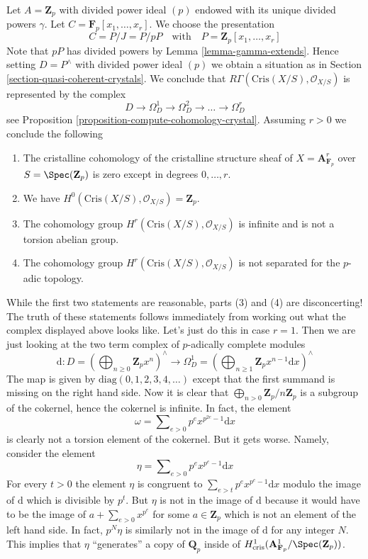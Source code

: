 \begin{example}
\label{example-affine-n-space}
Let $A = \mathbf{Z}_p$ with divided power ideal $(p)$ endowed with
its unique divided powers $\gamma$. Let
$C = \mathbf{F}_p[x_1, \ldots, x_r]$. We choose the presentation
$$
C = P/J = P/pP\quad\text{with}\quad P = \mathbf{Z}_p[x_1, \ldots, x_r]
$$
Note that $pP$ has divided powers by Lemma \ref{lemma-gamma-extends}.
Hence setting $D = P^\wedge$ with divided power ideal $(p)$ we obtain a
situation as in Section \ref{section-quasi-coherent-crystals}.
We conclude that $R\Gamma(\text{Cris}(X/S), \mathcal{O}_{X/S})$
is represented by the complex
$$
D \to \Omega^1_D \to \Omega^2_D \to \ldots \to \Omega^r_D
$$
see Proposition \ref{proposition-compute-cohomology-crystal}.
Assuming $r > 0$ we conclude the following
\begin{enumerate}
\item The cristalline cohomology of the cristalline structure sheaf
of $X = \mathbf{A}^r_{\mathbf{F}_p}$ over $S = \Spec(\mathbf{Z}_p)$
is zero except in degrees $0, \ldots, r$.
\item We have $H^0(\text{Cris}(X/S), \mathcal{O}_{X/S}) = \mathbf{Z}_p$.
\item The cohomology group $H^r(\text{Cris}(X/S), \mathcal{O}_{X/S})$
is infinite and is not a torsion abelian group.
\item The cohomology group $H^r(\text{Cris}(X/S), \mathcal{O}_{X/S})$
is not separated for the $p$-adic topology.
\end{enumerate}
While the first two statements are reasonable, parts (3) and (4) are
disconcerting! The truth of these statements follows immediately from
working out what the complex displayed above looks like. Let's just do
this in case $r = 1$. Then we are just looking at the two term complex
of $p$-adically complete modules
$$
\text{d} :
D = \left(
\bigoplus\nolimits_{n \geq 0} \mathbf{Z}_p x^n
\right)^\wedge
\longrightarrow
\Omega^1_D = \left(
\bigoplus\nolimits_{n \geq 1} \mathbf{Z}_p x^{n - 1}\text{d}x
\right)^\wedge
$$
The map is given by $\text{diag}(0, 1, 2, 3, 4, \ldots)$ except that
the first summand is missing on the right hand side. Now it is clear
that $\bigoplus_{n > 0} \mathbf{Z}_p/n\mathbf{Z}_p$ is a subgroup
of the cokernel, hence the cokernel is infinite. In fact, the element
$$
\omega = \sum\nolimits_{e > 0} p^e x^{p^{2e} - 1}\text{d}x
$$
is clearly not a torsion element of the cokernel. But it gets worse.
Namely, consider the element
$$
\eta = \sum\nolimits_{e > 0} p^e x^{p^e - 1}\text{d}x
$$
For every $t > 0$ the element $\eta$ is congruent to
$\sum_{e > t} p^e x^{p^e - 1}\text{d}x$ modulo the image of
$\text{d}$ which is divisible by $p^t$. But $\eta$ is not in the image of
$\text{d}$ because it would have to be the image of
$a + \sum_{e > 0} x^{p^e}$ for some $a \in \mathbf{Z}_p$
which is not an element of the left hand side. In fact, $p^N\eta$
is similarly not in the image of $\text{d}$ for any integer $N$.
This implies that $\eta$ ``generates'' a copy of $\mathbf{Q}_p$ inside
of $H^1_{\text{cris}}(\mathbf{A}_{\mathbf{F}_p}^1/\Spec(\mathbf{Z}_p))$.
\end{example}








